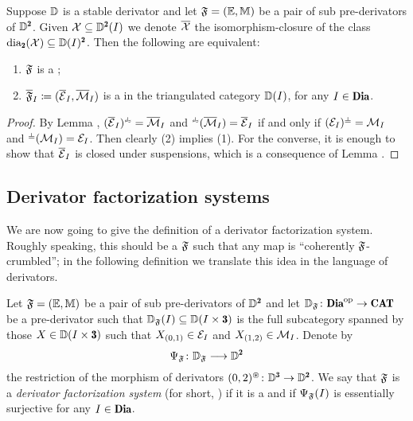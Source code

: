 \begin{proposition}\label{preco-are-homo}
Suppose $\mathbb{D}$ is a stable derivator and let $\mathfrak{F}=(\mathbb E,\mathbb M)$ be a pair of sub pre-derivators of $\D^\due$. Given $\class{X}\subseteq \D^\due(I)$ we denote $\overline{\mathcal{X}}$ the isomorphism\hyp{}closure of the class $\dia_\due(\class{X})\subseteq \D(I)^\due$. Then the following are equivalent:
\begin{enumerate}
\item $\mathfrak{F}$ is a \cpfs;
\item $\overline{\mathfrak{F}}_I \coloneqq (\overline{\mathcal{E}}_I,\overline{\mathcal{M}}_I)$ is a \phfs in the triangulated category $\mathbb{D}(I)$, for any $I\in\Dia$. 
\end{enumerate}
\end{proposition}
\begin{proof}
By Lemma , $(\overline\E_I)^{\horth}=\overline\M_I$ and ${}^{\horth}(\overline\M_I)=\overline\E_I$ if and only if $(\E_I)^{\corth}=\M_I$ and ${}^{\corth}(\M_I)=\E_I$. Then clearly (2) implies (1). For the converse, it is enough to show that $\overline{\mathcal{E}}_I$ is closed under suspensions, which is a consequence of Lemma .
\end{proof}
\subsection{Derivator factorization systems} 
We are now going to give the definition of a derivator factorization system. Roughly speaking, this should be a \cpfs $\mathfrak{F}$ such that any map is ``coherently $\mathfrak{F}$-crumbled''; in the following definition we translate this idea in the language of derivators.


\begin{definition}\label{def_hfs}
Let $\mathfrak{F}=(\mathbb E,\mathbb M)$ be a pair of sub pre-derivators of $\D^\due$ and let 
$\D_\F\colon \Dia^\opp\to \Cat$
be a pre-derivator such that $\D_{\F}(I)\subseteq \D(I\times \tre)$ is the full subcategory spanned by those $X\in  \D(I\times \tre)$ such that $X_{(0,1)}\in \mathcal{E}_I$ and $X_{(1,2)}\in \mathcal{M}_I$. Denote by 
\[
\Psi_\F\colon \D_\F\longrightarrow \D^{\due}
\]
the restriction of the morphism of derivators $(0,2)^\circledast\colon\D^{\tre}\to \D^{\due}$. We say that $\mathfrak{F}$ is a \emph{derivator factorization system} (for short, \dfs) if it is a \cpfs and if $\Psi_{\mathfrak{F}}(I)$ is essentially surjective for any $I\in \Dia$.
\end{definition}


